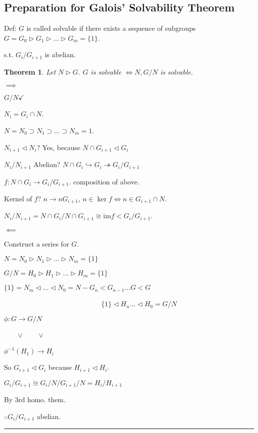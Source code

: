\documentclass[twoside]{article}
\newcounter{lecnum}
\newcommand{\ra}{\rightarrow}
\newcommand{\hra}{\hookrightarrow}
\newcommand{\trr}{\triangleright}
\newcommand{\trl}{\triangleleft}
\newtheorem{theorem}{Theorem}[lecnum]
\newenvironment{proof}{{\bf Proof:}}{\hfill\rule{2mm}{2mm}}
\begin{document}
\subsection{Preparation for Galois' Solvability Theorem}

Def: $G$ is called solvable if there exists a sequence of subgroups $G = G_0 \triangleright G_1 \triangleright \dots \trr G_m  = \{1\}$.

s.t. $G_i/G_{i+1}$ is abelian. 

\begin{theorem}
    Let $N \trr G$. $G$ is solvable $\iff N, G/N$ is solvable.  
\end{theorem}

\begin{proof}
    $\implies$ 
    
    $G/N \checkmark$

    $N_i = G_i \cap N$. 

    $N = N_0 \supset N_1 \supset \dots \supset N_m = 1$.

    $N_{i+1} \trl N_i$? Yes, because $N \cap G_{i+1} \trl G_i$

    $N_i/N_{i+1}$ Abelian? $N \cap G_i \hra G_i \twoheadrightarrow G_i/G_{i+1}$ 

    $f: N \cap G_i \rightarrow G_i/G_{i+1}$. composition of above. 

    Kernel of $f$? $n \rightarrow nG_{i+1}$, $n \in \ker f \iff n \in G_{i+1} \cap N$. 


    $N_i/N_{i+1} = N\cap G_i/N\cap G_{i+1} \cong \text{im} f < G_i/G_{i+1}$. 

    $\impliedby$

    Construct a series for $G$. 

    $N = N_0 \trr N_1 \trr \dots \trr N_m = \{1\}$

    $G/N = H_0 \trr H_1 \trr \dots \trr H_m = \{1\}$

    $\{1\}= N_m \trl \dots \trl N_0 = N - G_n < G_{n-1} \dots G < G $

    \ \ \ \ \ \ \ \ \ \ \ \ \ \ \ \ \ \ \ \ \ \ \ \ \ \ \ \    $\{1\} \trl H_n \dots \trl H_0 = G/N$

    $\phi : G \ra G/N$
    
    \ \ \ \ $\vee$     \ \ \ \ $\vee$


    $\phi^{-1}(H_1) \rightarrow H_i$


So $G_{i+1} \trl G_i$ because $H_{i+1} \trl H_i$. 

$G_i/G_{i+1} \cong {G_i/N}/{G_{i+1}/N} = H_i/H_{i+1}$

By 3rd homo. them. 

$\therefore G_i/G_{i+1}$ abelian. 

\end{proof}
\end{document}
